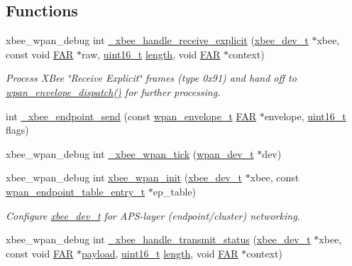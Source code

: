 \subsection*{Functions}
\begin{DoxyCompactItemize}
\item 
xbee\+\_\+wpan\+\_\+debug int \hyperlink{group__xbee__wpan_ga8cb1973677412a2c5627a77009a8f283}{\+\_\+xbee\+\_\+handle\+\_\+receive\+\_\+explicit} (\hyperlink{structxbee__dev__t}{xbee\+\_\+dev\+\_\+t} $\ast$xbee, const void \hyperlink{group__hal_gaef060b3456fdcc093a7210a762d5f2ed}{F\+AR} $\ast$raw, \hyperlink{group__hal__dos_ga5a8b2dc9e45a9ee81a94ef304fb62505}{uint16\+\_\+t} \hyperlink{group__zdo_gab2b3adeb2a67e656ff030b56727fd0ac}{length}, void \hyperlink{group__hal_gaef060b3456fdcc093a7210a762d5f2ed}{F\+AR} $\ast$context)
\begin{DoxyCompactList}\small\item\em Process X\+Bee \char`\"{}\+Receive Explicit\char`\"{} frames (type 0x91) and hand off to \hyperlink{group__wpan__aps_gae84eafd10f51de6cdac4732b8948606d}{wpan\+\_\+envelope\+\_\+dispatch()} for further processing. \end{DoxyCompactList}\item 
int \hyperlink{group__xbee__wpan_ga1e5f537223d8dffb4d74f48bbc43d149}{\+\_\+xbee\+\_\+endpoint\+\_\+send} (const \hyperlink{structwpan__envelope__t}{wpan\+\_\+envelope\+\_\+t} \hyperlink{group__hal_gaef060b3456fdcc093a7210a762d5f2ed}{F\+AR} $\ast$envelope, \hyperlink{group__hal__dos_ga5a8b2dc9e45a9ee81a94ef304fb62505}{uint16\+\_\+t} flags)
\item 
xbee\+\_\+wpan\+\_\+debug int \hyperlink{group__xbee__wpan_ga7c0492680badfd8ee30c5d797395394f}{\+\_\+xbee\+\_\+wpan\+\_\+tick} (\hyperlink{structwpan__dev__t}{wpan\+\_\+dev\+\_\+t} $\ast$dev)
\item 
xbee\+\_\+wpan\+\_\+debug int \hyperlink{group__xbee__wpan_ga6b3d55dddb48e31d3f975f2afb4c9977}{xbee\+\_\+wpan\+\_\+init} (\hyperlink{structxbee__dev__t}{xbee\+\_\+dev\+\_\+t} $\ast$xbee, const \hyperlink{structwpan__endpoint__table__entry__t}{wpan\+\_\+endpoint\+\_\+table\+\_\+entry\+\_\+t} $\ast$ep\+\_\+table)
\begin{DoxyCompactList}\small\item\em Configure \hyperlink{structxbee__dev__t}{xbee\+\_\+dev\+\_\+t} for A\+P\+S-\/layer (endpoint/cluster) networking. \end{DoxyCompactList}\item 
xbee\+\_\+wpan\+\_\+debug int \hyperlink{group__xbee__wpan_ga56d68291ceee384fbd8a5833eb91182c}{\+\_\+xbee\+\_\+handle\+\_\+transmit\+\_\+status} (\hyperlink{structxbee__dev__t}{xbee\+\_\+dev\+\_\+t} $\ast$xbee, const void \hyperlink{group__hal_gaef060b3456fdcc093a7210a762d5f2ed}{F\+AR} $\ast$\hyperlink{group__zcl_gacb1403989580c30b5cac60f347c5d6ab}{payload}, \hyperlink{group__hal__dos_ga5a8b2dc9e45a9ee81a94ef304fb62505}{uint16\+\_\+t} \hyperlink{group__zdo_gab2b3adeb2a67e656ff030b56727fd0ac}{length}, void \hyperlink{group__hal_gaef060b3456fdcc093a7210a762d5f2ed}{F\+AR} $\ast$context)

\end{DoxyCompactItemize}
